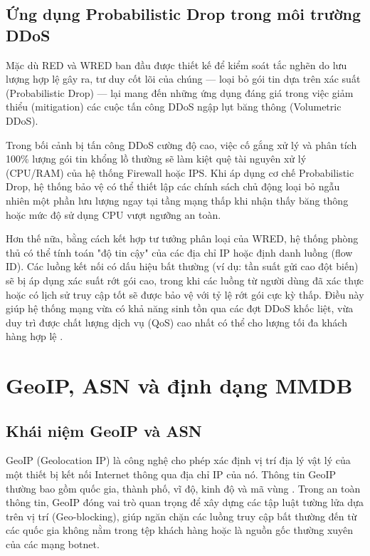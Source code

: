 \documentclass[../DoAn.tex]{subfiles}
\begin{document}
\subsection{Ứng dụng Probabilistic Drop trong môi trường DDoS}
Mặc dù RED và WRED ban đầu được thiết kế để kiểm soát tắc nghẽn do lưu lượng hợp lệ gây ra, tư duy cốt lõi của chúng — loại bỏ gói tin dựa trên xác suất (Probabilistic Drop) — lại mang đến những ứng dụng đáng giá trong việc giảm thiểu (mitigation) các cuộc tấn công DDoS ngập lụt băng thông (Volumetric DDoS). 

Trong bối cảnh bị tấn công DDoS cường độ cao, việc cố gắng xử lý và phân tích 100\% lượng gói tin khổng lồ thường sẽ làm kiệt quệ tài nguyên xử lý (CPU/RAM) của hệ thống Firewall hoặc IPS. Khi áp dụng cơ chế Probabilistic Drop, hệ thống bảo vệ có thể thiết lập các chính sách chủ động loại bỏ ngẫu nhiên một phần lưu lượng ngay tại tầng mạng thấp khi nhận thấy băng thông hoặc mức độ sử dụng CPU vượt ngưỡng an toàn. 

Hơn thế nữa, bằng cách kết hợp tư tưởng phân loại của WRED, hệ thống phòng thủ có thể tính toán "độ tin cậy" của các địa chỉ IP hoặc định danh luồng (flow ID). Các luồng kết nối có dấu hiệu bất thường (ví dụ: tần suất gửi cao đột biến) sẽ bị áp dụng xác suất rớt gói cao, trong khi các luồng từ người dùng đã xác thực hoặc có lịch sử truy cập tốt sẽ được bảo vệ với tỷ lệ rớt gói cực kỳ thấp. Điều này giúp hệ thống mạng vừa có khả năng sinh tồn qua các đợt DDoS khốc liệt, vừa duy trì được chất lượng dịch vụ (QoS) cao nhất có thể cho lượng tối đa khách hàng hợp lệ \cite{floyd1993random}.

\section{GeoIP, ASN và định dạng MMDB}
\subsection{Khái niệm GeoIP và ASN}
GeoIP (Geolocation IP) là công nghệ cho phép xác định vị trí địa lý vật lý của một thiết bị kết nối Internet thông qua địa chỉ IP của nó. Thông tin GeoIP thường bao gồm quốc gia, thành phố, vĩ độ, kinh độ và mã vùng \cite{maxmind2025mmdb}. Trong an toàn thông tin, GeoIP đóng vai trò quan trọng để xây dựng các tập luật tường lửa dựa trên vị trí (Geo-blocking), giúp ngăn chặn các luồng truy cập bất thường đến từ các quốc gia không nằm trong tệp khách hàng hoặc là nguồn gốc thường xuyên của các mạng botnet.
\end{document}
